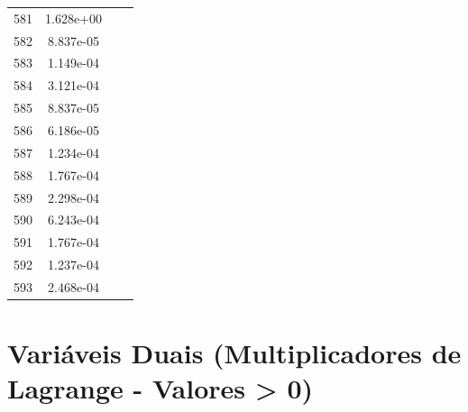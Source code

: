 \documentclass[12pt]{article}
\begin{document}
\begin{longtable}{@{}cccc@{}}
581 & 1.628e+00 &  &  \\
582 & 8.837e-05 &  &  \\
583 & 1.149e-04 &  &  \\
584 & 3.121e-04 &  &  \\
585 & 8.837e-05 &  &  \\
586 & 6.186e-05 &  &  \\
587 & 1.234e-04 &  &  \\
588 & 1.767e-04 &  &  \\
589 & 2.298e-04 &  &  \\
590 & 6.243e-04 &  &  \\
591 & 1.767e-04 &  &  \\
592 & 1.237e-04 &  &  \\
593 & 2.468e-04 &  &  \\

\bottomrule
\end{longtable}


\section{Variáveis Duais (Multiplicadores de Lagrange - Valores > 0)}
\end{document}
